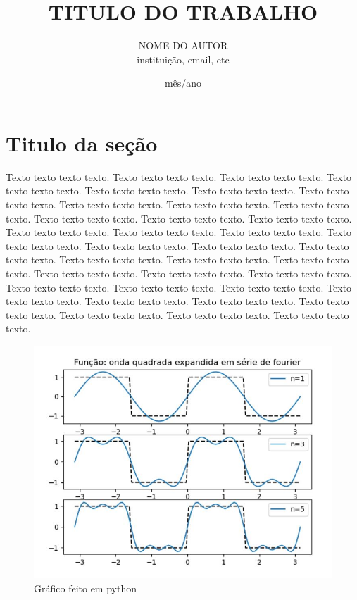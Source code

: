 \documentclass[a4paper, 12pt]{article}
\title{TITULO DO TRABALHO}
\author{NOME DO AUTOR \\ instituição, email, etc}
\date{mês/ano}
\begin{document}
\maketitle %
\newpage %

\tableofcontents %
\newpage

\listoffigures %
\newpage

\listoftables %
\newpage

\section{Titulo da seção} %

Texto texto texto texto. Texto texto texto texto. Texto texto texto texto. Texto texto texto texto.
Texto texto texto texto. Texto texto texto texto. Texto texto texto texto. Texto texto texto texto.
Texto texto texto texto. Texto texto texto texto. Texto texto texto texto. Texto texto texto texto.
Texto texto texto texto. Texto texto texto texto. Texto texto texto texto. Texto texto texto texto.
Texto texto texto texto. Texto texto texto texto. Texto texto texto texto. Texto texto texto texto.
Texto texto texto texto. Texto texto texto texto. Texto texto texto texto. Texto texto texto texto.
Texto texto texto texto. Texto texto texto texto. Texto texto texto texto. Texto texto texto texto.
Texto texto texto texto. Texto texto texto texto. Texto texto texto texto. Texto texto texto texto.
Texto texto texto texto. Texto texto texto texto. Texto texto texto texto. Texto texto texto texto.

\begin{figure}[!htb]
	\centering
	\includegraphics[scale=0.5]{img/fig1.png}
	\caption{Gráfico feito em python}
	\label{grafico-python}
\end{figure}
\end{document}
